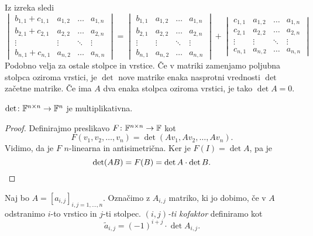 \documentclass[12pt, a4paper]{article}
\begin{document}
\begin{opomba}
Iz izreka sledi
\[
\begin{vmatrix}
b_{1,1}+c_{1,1} & a_{1,2} & \dots  & a_{1,n} \\ 
b_{2,1}+c_{2,1} & a_{2,2} & \dots  & a_{2,n} \\ 
\vdots          & \vdots  & \ddots & \vdots \\ 
b_{n,1}+c_{n,1} & a_{n,2} & \dots  & a_{n,n}
\end{vmatrix}
=
\begin{vmatrix}
b_{1,1} & a_{1,2} & \dots  & a_{1,n} \\ 
b_{2,1} & a_{2,2} & \dots  & a_{2,n} \\ 
\vdots  & \vdots  & \ddots & \vdots \\ 
b_{n,1} & a_{n,2} & \dots  & a_{n,n}
\end{vmatrix} 
+
\begin{vmatrix}
c_{1,1} & a_{1,2} & \dots  & a_{1,n} \\ 
c_{2,1} & a_{2,2} & \dots  & a_{2,n} \\ 
\vdots  & \vdots  & \ddots & \vdots \\ 
c_{n,1} & a_{n,2} & \dots  & a_{n,n}
\end{vmatrix} 
\]
Podobno velja za ostale stolpce in vrstice. Če v matriki zamenjamo poljubna stolpca oziroma vrstici, je $\det$ nove matrike enaka nasprotni vrednosti $\det$ začetne matrike. Če ima $A$ dva enaka stolpca oziroma vrstici, je tako $\det A=0$.
\end{opomba}

\begin{izrek}
$\det\colon\mathbb{F}^{n\times n}\to\mathbb{F}^n$ je multiplikativna.
\end{izrek}

\begin{proof}
Definirajmo preslikavo $F\colon\mathbb{F}^{n\times n}\to\mathbb{F}$ kot
\[
F(v_1,v_2,\dots,v_n)=\det(Av_1,Av_2,\dots,Av_n).
\]
Vidimo, da je $F$ $n$-linearna in antisimetrična. Ker je $F(I)=\det A$, pa je
\[
\det(AB)=F(B)=\det A\cdot\det B.\qedhere
\]
\end{proof}

\begin{definicija}
Naj bo $A=\left[a_{i,j}\right]_{i,j=1,\dots,n}$. Označimo z $A_{i,j}$ matriko, ki jo dobimo, če v $A$ odstranimo $i$-to vrstico in $j$-ti stolpec. \emph{$(i,j)$-ti kofaktor} definiramo kot
\[
\widetilde{a}_{i,j}=(-1)^{i+j}\cdot\det A_{i,j}.
\]
\end{definicija}
\end{document}
